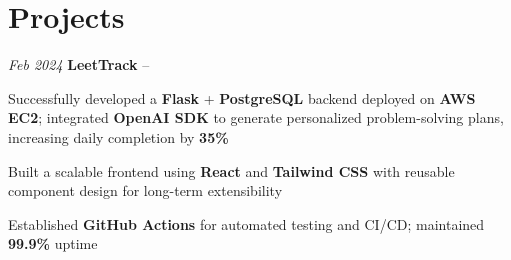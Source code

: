 \section{Projects}

\begin{twocolentry}{
    \textit{Feb 2024}
}{
    \textbf{LeetTrack} -- 
}
\end{twocolentry}
\begin{onecolentry}
    \begin{highlights}
        \item Successfully developed a \textbf{Flask} + \textbf{PostgreSQL} backend deployed on \textbf{AWS EC2}; integrated \textbf{OpenAI SDK} to generate personalized problem-solving plans, increasing daily completion by \textbf{35\%}
        \item Built a scalable frontend using \textbf{React} and \textbf{Tailwind CSS} with reusable component design for long-term extensibility
        \item Established \textbf{GitHub Actions} for automated testing and CI/CD; maintained \textbf{99.9\%} uptime
    \end{highlights}
\end{onecolentry}
